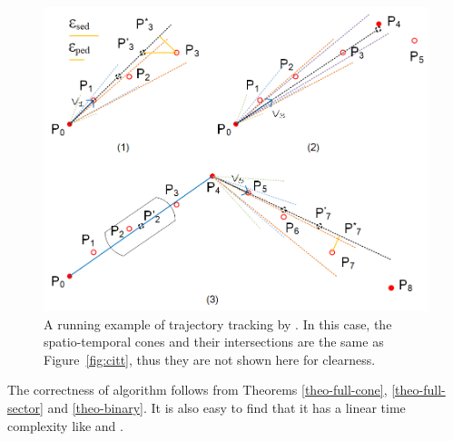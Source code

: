 \begin{figure}[tb!]
	\centering
	\includegraphics[scale=1.0]{figures/Fig-BITT.png}
	\vspace{-2ex}
	\caption{\small A running example of trajectory tracking by \bitt. In this case, the spatio-temporal cones and their intersections are the same as Figure~\ref{fig:citt}, thus they are not shown here for clearness.  }
	\vspace{-2ex}
	\label{fig:bitt}
\end{figure}

The correctness of algorithm \bitt follows from Theorems \ref{theo-full-cone}, \ref{theo-full-sector} and \ref{theo-binary}.
It is also easy to find that it has a linear time complexity like \citt and \sitt.


